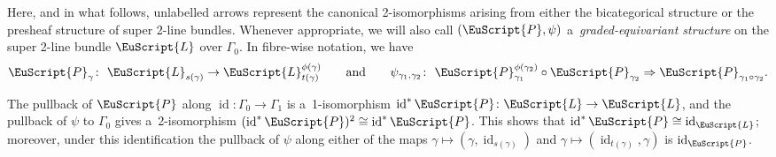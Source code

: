 \documentclass[10pt,a4paper]{amsart}
\numberwithin{equation}{section}
\def\mathscr#1{\EuScript{#1}}
\newcommand{\id}{\operatorname{id}}
\def\quand{\qquad\text{and}\qquad}
\begin{document}
Here, and in what follows, unlabelled arrows represent the canonical 2-isomorphisms arising from either the bicategorical structure or the presheaf structure of super 2-line bundles.
Whenever appropriate, we will also call $(\mathscr{P},\psi)$ a~\emph{graded-equivariant structure} on the super 2-line bundle $\mathscr{L}$ over $\Gamma_0$. In fibre-wise notation, we have
\begin{equation*}
 \mathscr{P}_\gamma\colon\ \mathscr{L}_{s(\gamma)} \to \mathscr{L}_{t(\gamma)}^{\phi(\gamma)}
\quand
 \psi_{\gamma_1,\gamma_2} \colon \ \mathscr{P}_{\gamma_1}^{\phi(\gamma_2)} \circ \mathscr{P}_{\gamma_2} \Rightarrow \mathscr{P}_{\gamma_1 \circ \gamma_2}.
\end{equation*}




\begin{Remark}
\label{normalized graded-equivariant structures}
The pullback of $\mathscr{P}$ along $\id\colon \Gamma_0 \to \Gamma_1$ is a~1-isomorphism $\id^{*}\mathscr{P}\colon \mathscr{L} \to \mathscr{L}$, and the pullback of $\psi$ to $\Gamma_0$ gives a~2-isomorphism $(\id^{*}\mathscr{P})^2 \cong \id^{*}\mathscr{P}$. This shows that $\id^{*}\mathscr{P}\cong \id_{\mathscr{L}}$; moreover, under this identification the pullback of $\psi$ along either of the maps $\gamma \mapsto (\gamma,\id_{s(\gamma)})$ and $\gamma \mapsto (\id_{t(\gamma)},\gamma)$ is $\id_{\mathscr{P}}$.
\end{Remark}
\end{document}
